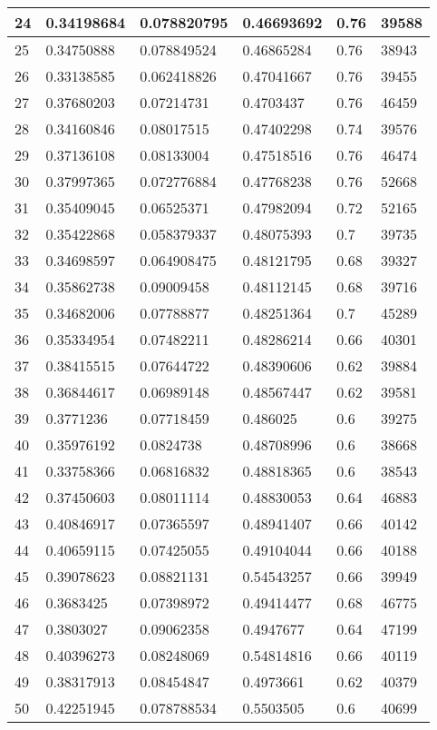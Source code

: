 \begin{longtable}{|l|l|l|l|l|l|}
24 & 0.34198684 & 0.078820795 & 0.46693692 & 0.76 & 39588 \\ \hline 
25 & 0.34750888 & 0.078849524 & 0.46865284 & 0.76 & 38943 \\ \hline 
26 & 0.33138585 & 0.062418826 & 0.47041667 & 0.76 & 39455 \\ \hline 
27 & 0.37680203 & 0.07214731 & 0.4703437 & 0.76 & 46459 \\ \hline 
28 & 0.34160846 & 0.08017515 & 0.47402298 & 0.74 & 39576 \\ \hline 
29 & 0.37136108 & 0.08133004 & 0.47518516 & 0.76 & 46474 \\ \hline 
30 & 0.37997365 & 0.072776884 & 0.47768238 & 0.76 & 52668 \\ \hline 
31 & 0.35409045 & 0.06525371 & 0.47982094 & 0.72 & 52165 \\ \hline 
32 & 0.35422868 & 0.058379337 & 0.48075393 & 0.7 & 39735 \\ \hline 
33 & 0.34698597 & 0.064908475 & 0.48121795 & 0.68 & 39327 \\ \hline 
34 & 0.35862738 & 0.09009458 & 0.48112145 & 0.68 & 39716 \\ \hline 
35 & 0.34682006 & 0.07788877 & 0.48251364 & 0.7 & 45289 \\ \hline 
36 & 0.35334954 & 0.07482211 & 0.48286214 & 0.66 & 40301 \\ \hline 
37 & 0.38415515 & 0.07644722 & 0.48390606 & 0.62 & 39884 \\ \hline 
38 & 0.36844617 & 0.06989148 & 0.48567447 & 0.62 & 39581 \\ \hline 
39 & 0.3771236 & 0.07718459 & 0.486025 & 0.6 & 39275 \\ \hline 
40 & 0.35976192 & 0.0824738 & 0.48708996 & 0.6 & 38668 \\ \hline 
41 & 0.33758366 & 0.06816832 & 0.48818365 & 0.6 & 38543 \\ \hline 
42 & 0.37450603 & 0.08011114 & 0.48830053 & 0.64 & 46883 \\ \hline 
43 & 0.40846917 & 0.07365597 & 0.48941407 & 0.66 & 40142 \\ \hline 
44 & 0.40659115 & 0.07425055 & 0.49104044 & 0.66 & 40188 \\ \hline 
45 & 0.39078623 & 0.08821131 & 0.54543257 & 0.66 & 39949 \\ \hline 
46 & 0.3683425 & 0.07398972 & 0.49414477 & 0.68 & 46775 \\ \hline 
47 & 0.3803027 & 0.09062358 & 0.4947677 & 0.64 & 47199 \\ \hline 
48 & 0.40396273 & 0.08248069 & 0.54814816 & 0.66 & 40119 \\ \hline 
49 & 0.38317913 & 0.08454847 & 0.4973661 & 0.62 & 40379 \\ \hline 
50 & 0.42251945 & 0.078788534 & 0.5503505 & 0.6 & 40699 \\ \hline 
\end{longtable}